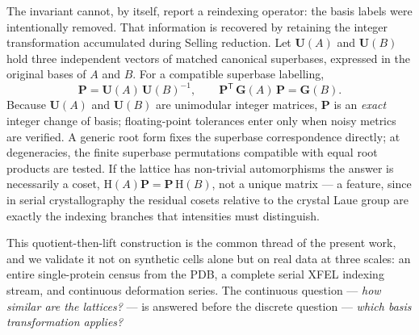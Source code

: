 \documentclass[11pt]{article}
\newcommand{\Gmet}{\mathbf{G}}
\newcommand{\Pop}{\mathbf{P}}
\newcommand{\Uop}{\mathbf{U}}
\begin{document}
The invariant cannot, by itself, report a reindexing operator: the basis labels
were intentionally removed. That information is recovered by retaining the
integer transformation accumulated during Selling reduction. Let $\Uop(A)$ and
$\Uop(B)$ hold three independent vectors of matched canonical superbases,
expressed in the original bases of $A$ and $B$. For a compatible superbase
labelling,
\begin{equation}
\label{eq:lift}
\Pop = \Uop(A)\,\Uop(B)^{-1}, \qquad
\Pop^{\mathsf T}\,\Gmet(A)\,\Pop = \Gmet(B).
\end{equation}
Because $\Uop(A)$ and $\Uop(B)$ are unimodular integer matrices, $\Pop$ is an
\emph{exact} integer change of basis; floating-point tolerances enter only when
noisy metrics are verified. A generic root form fixes the superbase
correspondence directly; at degeneracies, the finite superbase permutations
compatible with equal root products are tested. If the lattice has non-trivial
automorphisms the answer is necessarily a coset,
$\mathrm{H}(A)\Pop = \Pop\,\mathrm{H}(B)$, not a unique matrix --- a feature,
since in serial crystallography the residual cosets relative to the crystal Laue
group are exactly the indexing branches that intensities must distinguish.

This quotient-then-lift construction is the common thread of the present work,
and we validate it not on synthetic cells alone but on real data at three scales:
an entire single-protein census from the PDB, a complete serial XFEL indexing
stream, and continuous deformation series. The continuous question --- \emph{how
similar are the lattices?} --- is answered before the discrete question ---
\emph{which basis transformation applies?}
\end{document}
